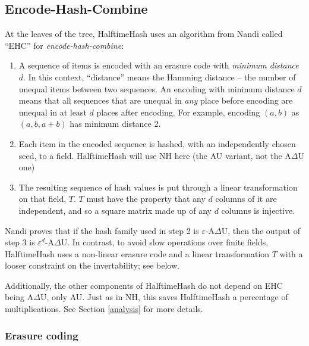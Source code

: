 \documentclass[sigconf, nonacm]{acmart}
\begin{document}

\subsection{Encode-Hash-Combine}

At the leaves of the tree, HalftimeHash uses an algorithm from Nandi called ``EHC'' for {\em encode-hash-combine}: \cite{ehc-nandi}

\begin{enumerate}
\item A sequence of items is encoded with an erasure code with {\em minimum distance $d$}.
  In this context, ``distance'' means the Hamming distance -- the number of unequal items between two sequences.
  An encoding with minimum distance $d$ means that all sequences that are unequal in {\em any} place before encoding are unequal in at least $d$ places after encoding.
  For example, encoding $(a,b)$ as $(a,b,a+b)$ has minimum distance 2.
\item Each item in the encoded sequence is hashed, with an independently chosen seed, to a field.
  HalftimeHash will use NH here (the AU variant, not the A$\Delta$U one)
\item The resulting sequence of hash values is put through a linear transformation on that field, $T$.
  $T$ must have the property that any $d$ columns of it are independent, and so a square matrix made up of any $d$ columns is injective.
\end{enumerate}

Nandi proves that if the hash family used in step 2 is $\varepsilon$-A$\Delta$U, then the output of step 3 is $\varepsilon^d$-A$\Delta$U.
In contrast, to avoid slow operations over finite fields, HalftimeHash uses a non-linear erasure code and a linear transformation $T$ with a looser constraint on the invertability; see below.

Additionally, the other components of HalftimeHash do not depend on EHC being A$\Delta$U, only AU.
Just as in NH, this saves HalftimeHash a percentage of multiplications.
See Section \ref{analysis} for more details.

\subsubsection{Erasure coding}
\end{document}
